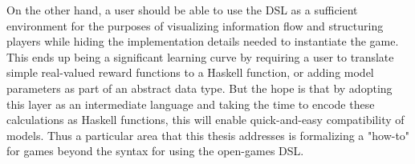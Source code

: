 On the other hand, a user should  be able to use the DSL as a sufficient environment for the purposes of visualizing information flow and structuring players while hiding the implementation details needed to instantiate the game. This ends up being a significant learning curve by requiring a user to translate simple real-valued reward functions to a Haskell function, or adding model parameters as part of an abstract data type. But the hope is that by adopting this layer as an intermediate language and taking the time to encode these calculations as Haskell functions, this will enable quick-and-easy compatibility of models. Thus a particular area that this thesis addresses is formalizing a "how-to" for games beyond the syntax for using the open-games DSL. 









